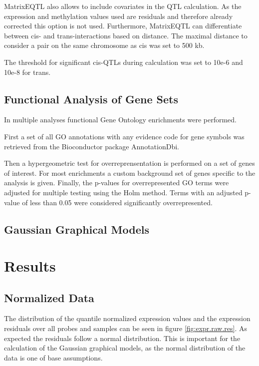 \documentclass[a4paper,12pt]{article}
\begin{document}
MatrixEQTL also allows to include covariates in the QTL calculation. As the expression and methylation values used are residuals and therefore already corrected this option is not used. Furthermore, MatrixEQTL can differentiate between cis- and trans-interactions based on distance. The maximal distance to consider a pair on the same chromosome as cis was set to 500 kb. 

The threshold for significant cis-QTLs during calculation was set to 10e-6 and 10e-8 for trans.



\subsection{Functional Analysis of Gene Sets}
In multiple analyses functional Gene Ontology enrichments were performed.

First a set of all GO annotations with any evidence code for gene symbols  was retrieved from the Bioconductor package AnnotationDbi\cite{AnnotationDbi}. 

Then a hypergeometric test\cite{GOstats} for overreprensentation is performed on a set of genes of interest. For most enrichments a custom background set of genes specific to the analysis is given. Finally, the p-values for overrepresented GO terms were adjusted for multiple testing using the Holm method\cite{10.2307/4615733}. Terms with an adjusted p-value of less than 0.05 were considered significantly overrepresented. 

\subsection{Gaussian Graphical Models}



\newpage
\section{Results}
\subsection{Normalized Data}
The distribution of the quantile normalized expression values and the expression residuals over all probes and samples can be seen in figure \ref{fig:expr.raw.res}. As expected the residuals follow a normal distribution. This is important for the calculation of the Gaussian graphical models, as the normal distribution of the data is one of base assumptions\cite{}.
\end{document}

